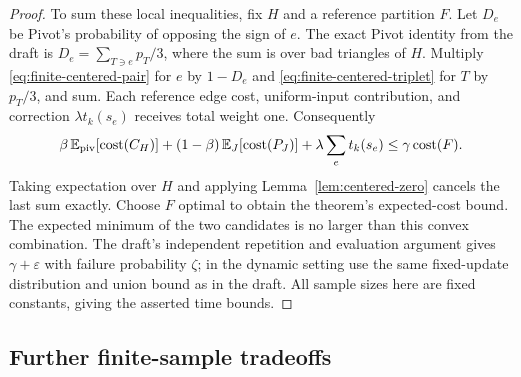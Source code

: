 \documentclass[11pt]{article}
\begin{document}
\begin{proof}
To sum these local inequalities, fix $H$ and a reference partition $F$.
Let $D_e$ be Pivot's probability of opposing the sign of $e$. The
exact Pivot identity from the draft is
$D_e=\sum_{T\ni e}p_T/3$, where the sum is over bad triangles of $H$.
Multiply \eqref{eq:finite-centered-pair} for $e$ by $1-D_e$ and
\eqref{eq:finite-centered-triplet} for $T$ by $p_T/3$, and sum.
Each reference edge cost, uniform-input contribution, and correction
$\lambda t_k(s_e)$ receives total weight one. Consequently
\[
 \beta\,\mathbb E_{\rm piv}[\operatorname{cost}(C_H)]
 +(1-\beta)\,\mathbb E_J[\operatorname{cost}(P_J)]
 +\lambda\sum_e t_k(s_e)
 \le\gamma\operatorname{cost}(F).
\]
Taking expectation over $H$ and applying Lemma~\ref{lem:centered-zero}
cancels the last sum exactly. Choose $F$ optimal to obtain the theorem's
expected-cost bound. The expected minimum of the two candidates is
no larger than this convex combination. The draft's independent
repetition and evaluation argument gives $\gamma+\varepsilon$ with
failure probability $\zeta$; in the dynamic setting use the same
fixed-update distribution and union bound as in the draft. All sample
sizes here are fixed constants, giving the asserted time bounds.
\end{proof}

\subsection{Further finite-sample tradeoffs}
\end{document}
